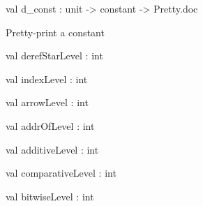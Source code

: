 \documentclass[11pt]{article}
\begin{document}
\label{val:Cil.d-underscoreconst}\begin{ocamldoccode}
val d_const : unit -> constant -> Pretty.doc
\end{ocamldoccode}
\begin{ocamldocdescription}
Pretty-print a constant


\end{ocamldocdescription}




\label{val:Cil.derefStarLevel}\begin{ocamldoccode}
val derefStarLevel : int
\end{ocamldoccode}




\label{val:Cil.indexLevel}\begin{ocamldoccode}
val indexLevel : int
\end{ocamldoccode}




\label{val:Cil.arrowLevel}\begin{ocamldoccode}
val arrowLevel : int
\end{ocamldoccode}




\label{val:Cil.addrOfLevel}\begin{ocamldoccode}
val addrOfLevel : int
\end{ocamldoccode}




\label{val:Cil.additiveLevel}\begin{ocamldoccode}
val additiveLevel : int
\end{ocamldoccode}




\label{val:Cil.comparativeLevel}\begin{ocamldoccode}
val comparativeLevel : int
\end{ocamldoccode}




\label{val:Cil.bitwiseLevel}\begin{ocamldoccode}
val bitwiseLevel : int
\end{ocamldoccode}
\end{document}
